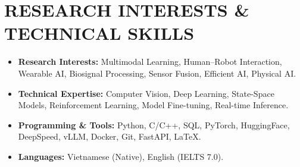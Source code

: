 \documentclass[letterpaper,10pt]{article}
\begin{document}
\section{RESEARCH INTERESTS \& TECHNICAL SKILLS}

\begin{itemize}

  \item \textbf{Research Interests:}
  Multimodal Learning, Human--Robot Interaction,
  Wearable AI, Biosignal Processing, Sensor Fusion,
  Efficient AI, Physical AI.

  \item \textbf{Technical Expertise:}
  Computer Vision, Deep Learning,
  State-Space Models, Reinforcement Learning,
  Model Fine-tuning, Real-time Inference.

  \item \textbf{Programming \& Tools:}
  Python, C/C++, SQL, PyTorch, HuggingFace,
  DeepSpeed, vLLM, Docker, Git, FastAPI, \LaTeX.

  \item \textbf{Languages:}
  Vietnamese (Native), English (IELTS 7.0).

\end{itemize}
\end{document}
